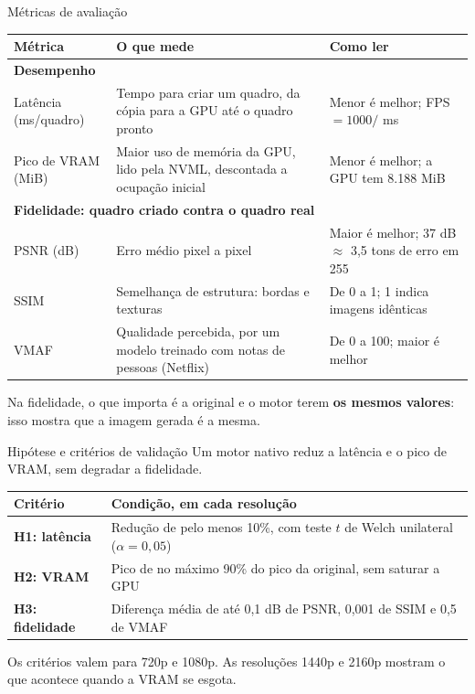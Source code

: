 \documentclass[
    aspectratio=169,
    12pt,
    brazil,
    xcolor=table
]{beamer}
\newcommand{\destaque}[1]{{\color{senacblue}\bfseries #1}}
\begin{document}
\begin{frame}{Métricas de avaliação}
  \centering
  \footnotesize
  \renewcommand{\arraystretch}{1.3}
  \begin{tabular}{p{2.6cm}p{6.0cm}p{5.2cm}}
    \toprule
    \textbf{Métrica} & \textbf{O que mede} & \textbf{Como ler} \\
    \midrule
    \multicolumn{3}{l}{\textbf{\color{senacblue}Desempenho}} \\
    Latência (ms/quadro) & Tempo para criar um quadro, da cópia para a GPU até o quadro pronto & Menor é melhor; FPS $= 1000 /$ ms \\
    Pico de VRAM (MiB) & Maior uso de memória da GPU, lido pela NVML, descontada a ocupação inicial & Menor é melhor; a GPU tem 8.188 MiB \\
    \midrule
    \multicolumn{3}{l}{\textbf{\color{senacblue}Fidelidade: quadro criado contra o quadro real}} \\
    PSNR (dB) & Erro médio pixel a pixel & Maior é melhor; 37 dB $\approx$ 3,5 tons de erro em 255 \\
    SSIM & Semelhança de estrutura: bordas e texturas & De 0 a 1; 1 indica imagens idênticas \\
    VMAF & Qualidade percebida, por um modelo treinado com notas de pessoas (Netflix) & De 0 a 100; maior é melhor \\
    \bottomrule
  \end{tabular}
  \vspace{6pt}

  \raggedright\small
  Na fidelidade, o que importa é a original e o motor terem \destaque{os mesmos valores}: isso mostra que a imagem gerada é a mesma.
\end{frame}

\begin{frame}{Hipótese e critérios de validação}
  Um motor nativo reduz a latência e o pico de VRAM, sem degradar a fidelidade.
  \vspace{8pt}

  \centering
  \small
  \renewcommand{\arraystretch}{1.3}
  \begin{tabular}{lp{10.4cm}}
    \toprule
    \textbf{Critério} & \textbf{Condição, em cada resolução} \\
    \midrule
    \textbf{H1: latência} & Redução de pelo menos 10\%, com teste $t$ de Welch unilateral ($\alpha = 0{,}05$) \\
    \textbf{H2: VRAM} & Pico de no máximo 90\% do pico da original, sem saturar a GPU \\
    \textbf{H3: fidelidade} & Diferença média de até 0,1 dB de PSNR, 0,001 de SSIM e 0,5 de VMAF \\
    \bottomrule
  \end{tabular}
  \vspace{8pt}

  \raggedright
  Os critérios valem para 720p e 1080p. As resoluções 1440p e 2160p mostram o que acontece quando a VRAM se esgota.
\end{frame}
\end{document}
